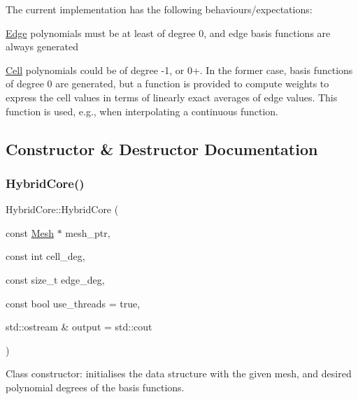 The current implementation has the following behaviours/expectations\+:
\begin{DoxyItemize}
\item \hyperlink{classHArDCore2D_1_1Edge}{Edge} polynomials must be at least of degree 0, and edge basis functions are always generated
\item \hyperlink{classHArDCore2D_1_1Cell}{Cell} polynomials could be of degree -\/1, or 0+. In the former case, basis functions of degree 0 are generated, but a function is provided to compute weights to express the cell values in terms of linearly exact averages of edge values. This function is used, e.\+g., when interpolating a continuous function. 
\end{DoxyItemize}

\subsection{Constructor \& Destructor Documentation}
\mbox{\label{classHArDCore2D_1_1HybridCore_ac6d3499861364085cc61cdde5c2c1241}} 
\subsubsection{\texorpdfstring{Hybrid\+Core()}{HybridCore()}}
{\footnotesize\ttfamily Hybrid\+Core\+::\+Hybrid\+Core (\begin{DoxyParamCaption}\item[{const \hyperlink{classHArDCore2D_1_1Mesh}{Mesh} $\ast$}]{mesh\+\_\+ptr,  }\item[{const int}]{cell\+\_\+deg,  }\item[{const size\+\_\+t}]{edge\+\_\+deg,  }\item[{const bool}]{use\+\_\+threads = {\ttfamily true},  }\item[{std\+::ostream \&}]{output = {\ttfamily std\+:\+:cout} }\end{DoxyParamCaption})}



Class constructor\+: initialises the data structure with the given mesh, and desired polynomial degrees of the basis functions. 

